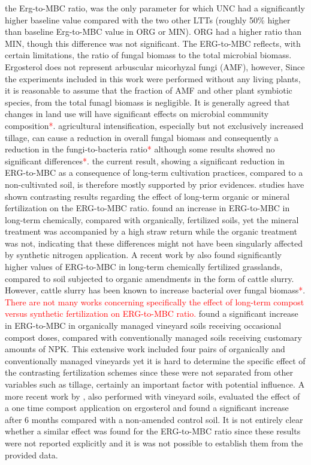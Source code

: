 \documentclass[12pt]{report}
\newcommand{\myRed}[1]{\textcolor{red}{#1}} %
\begin{document}
			the Erg-to-MBC ratio, was the only parameter for which UNC had a significantly higher baseline value compared with the two other LTTs (roughly 50\% higher than baseline Erg-to-MBC value in ORG or MIN).   
			ORG had a higher ratio than MIN, though this difference was not significant. The ERG-to-MBC reflects, with certain limitations, the ratio of fungal biomass to the total microbial biomass. Ergosterol does not represent arbuscular micorhyzal fungi (AMF), however, Since the experiments included in this work were performed without any living plants, it is reasonable to assume that the fraction of AMF and other plant symbiotic species, from the total funagl biomass is negligible. 
			It is generally agreed that changes in land use will have significant effects on microbial community composition\myRed{*}. agricultural intensification, especially but not exclusively increased tillage, can cause a reduction in overall fungal biomass and consequently a reduction in the fungi-to-bacteria ratio\myRed{*} although some results showed no significant differences\myRed{*}. 
			the current result, showing a significant reduction in ERG-to-MBC as a consequence of long-term cultivation practices, compared to a non-cultivated soil, is therefore mostly supported by prior evidences.
			studies have shown contrasting results regarding the effect of long-term organic or mineral fertilization on the ERG-to-MBC ratio. \citet{heinze2010} found an increase in ERG-to-MBC in long-term chemically, compared with organically, fertilized soils, yet the mineral treatment was accompanied by a high straw return while the organic treatment was not, indicating that these differences might not have been  singularly affected by synthetic nitrogen application. A recent work by \citet{knoblauch2017} also found significantly higher values of ERG-to-MBC in long-term chemically fertilized grasslands, compared to soil subjected to organic amendments in the form of cattle slurry. However, cattle slurry has been known to increase bacterial over fungal biomass\myRed{*}.
			\myRed{There are not many works concerning specifically the effect of long-term compost versus synthetic fertilization on ERG-to-MBC ratio.} \citet{probst2008} found a significant increase in ERG-to-MBC in organically managed vineyard soils receiving occasional compost doses, compared with conventionally managed soils receiving customary amounts of NPK. This extensive work included four pairs of organically and conventionally managed vineyards yet it is hard to determine the specific effect of the contrasting fertilization schemes since these were not separated from other variables such as tillage, certainly an important factor with potential influence. A more recent work by \citet{mackie2015} , also performed with vineyard soils, evaluated the effect of a one time compost application on ergosterol and found a significant increase after 6 months compared with a non-amended control soil. It is not entirely clear whether a similar effect was found for the ERG-to-MBC ratio since these results were not reported explicitly and it is was not possible to establish them from the provided data. 
\end{document}
